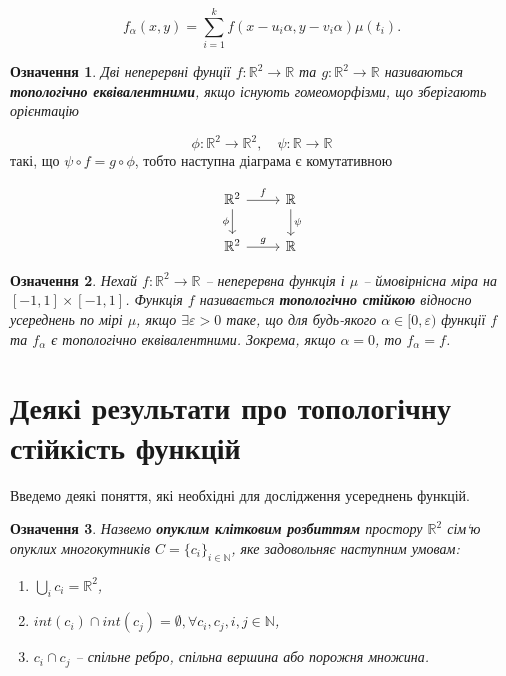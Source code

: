 \documentclass[12pt]{article}
\newtheorem{definition}{Означення}
\begin{document}
\begin{equation} 
	\label{discrete_averaging}
	f_\alpha(x,y)=\sum_{i=1}^{k}f(x-u_{i}\alpha, y-v_{i}\alpha)\mu(t_{i}).
\end{equation}

\begin{definition}
	Дві неперервні фунції $f:\mathbb{R}^2\rightarrow \mathbb{R}$ та $g:\mathbb{R}^2\rightarrow \mathbb{R}$ називаються \textbf{топологічно еквівалентними}, якщо існують гомеоморфізми, що зберігають орієнтацію 
\end{definition}

\begin{equation} 
	\phi:\mathbb{R}^2\rightarrow \mathbb{R}^2, \quad \psi:\mathbb{R}\rightarrow \mathbb{R}
\end{equation} такі, що $\psi \circ f=g \circ \phi$, тобто наступна діаграма є комутативною

\[\begin{tikzcd}
	\mathbb{R}^2 \arrow{r}{f} \arrow[swap]{d}{\phi} & \mathbb{R} \arrow{d}{\psi} \\
	\mathbb{R}^2 \arrow{r}{g} & \mathbb{R}
\end{tikzcd}
\]

\begin{definition}
	Нехай $f:\mathbb{R}^2 \rightarrow \mathbb{R}$ – неперервна функція і $\mu$ – ймовірнісна міра на $[-1,1]\times[-1,1]$. Функція $f$ називається \textbf{топологічно стійкою} відносно усереднень по мірі $\mu$, якщо $\exists \varepsilon>0$ таке, що для будь-якого $\alpha \in [0, \varepsilon)$ функції $f$ та $f_{\alpha}$ є топологічно еквівалентними. Зокрема, якщо $\alpha=0$, то $f_\alpha=f$.
\end{definition}

\setcounter{secnumdepth}{1}
\section{Деякі результати про топологічну стійкість функцій}

Введемо деякі поняття, які необхідні для дослідження усереднень функцій.

\begin{definition}
	Назвемо \textbf{опуклим клітковим розбиттям} простору $\mathbb{R}^2$ сім`ю опуклих многокутників $C=\{c_i\}_{i \in \mathbb{N}}$, яке задовольняє наступним умовам:
	
	\begin{enumerate}
		\item $\bigcup\limits_{i}^{} c_{i}=\mathbb{R}^2$,
		\item $int(c_i) \cap int(c_j)=\emptyset, \forall c_i, c_j, i,j \in \mathbb{N}$,
		\item $c_i \cap c_j$ – спільне ребро, спільна вершина або порожня множина.
	\end{enumerate}
\end{definition}
\end{document}
